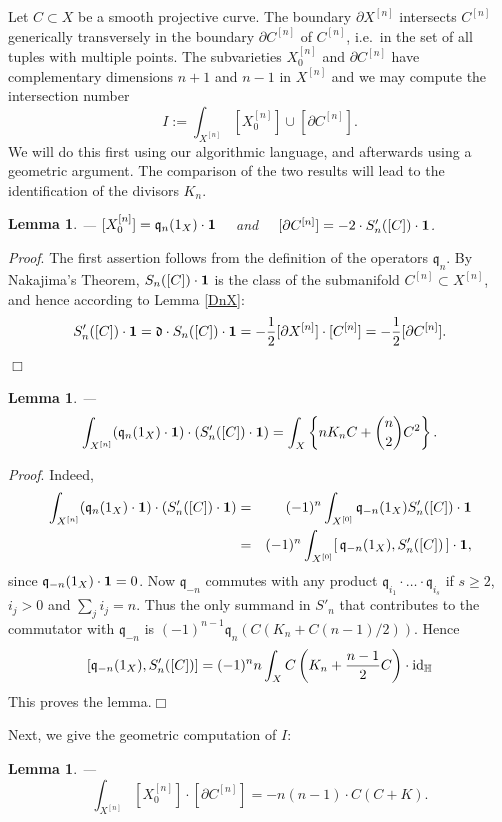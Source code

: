 \documentclass[twoside,11pt]{article}
\newtheorem{lemma}[theorem]{Lemma}
\newcommand{\prf}{{\kursiv Proof}. }
\newcommand{\qed}{\hspace*{\fill}$\Box$\vspace{2ex}}
\newcommand{\kursiv}{\sl}
\newcommand{\IH}{{\mathbb H}}
\newcommand{\gothd}{{\mathfrak d}}
\newcommand{\gothq}{{\mathfrak q}}
\newcommand{\dd}{\gothd}
\newcommand{\qq}{\gothq}
\newcommand{\vacuum}{{\bf 1}}
\newcommand{\id}{{\rm id}}
\begin{document}
Let $C\subset X$ be a smooth projective curve. The boundary $\partial X^{[n]}$
intersects $C^{[n]}$ generically transversely in the boundary 
$\partial C^{[n]}$ of $C^{[n]}$, i.e.\ in the set of all tuples with multiple
points. The subvarieties $X^{[n]}_0$ and $\partial C^{[n]}$ have complementary
dimensions $n+1$ and $n-1$ in $X^{[n]}$ and we may compute the intersection number
$$I:=\int_{X^{[n]}}[X^{[n]}_0]\cup [\partial C^{[n]}].$$
We will do this first using our algorithmic language, and afterwards using a 
geometric argument. The comparison of the two results will lead to the 
identification of the divisors $K_n$.

\begin{lemma}\label{ersterWega}--- $[X^{[n]}_0]=\qq_n(1_X)\cdot\vacuum$ ~~and~~
$[\partial C^{[n]}]=-2\cdot S'_n([C])\cdot\vacuum$.
\end{lemma}


\prf The first assertion follows from the definition of the operators
$\qq_n$.
By Nakajima's Theorem, $S_n([C])\cdot\vacuum$ is the
class of the submanifold $C^{[n]}\subset X^{[n]}$, and hence according to Lemma
\ref{DnX}:
$$S_n'([C])\cdot\vacuum=\dd\cdot S_n([C])\cdot\vacuum=
-\frac{1}{2}[\partial X^{[n]}]\cdot[C^{[n]}]=-\frac{1}{2}[\partial C^{[n]}].$$
\qed

\begin{lemma}\label{ersterWegb}---
$$\int_{X^{[n]}}(\qq_n(1_X)\cdot\vacuum)\cdot(S_n'([C])\cdot\vacuum)=\int_X \left\{nK_nC+\binom{n}{2}C^2\right\}.$$
\end{lemma}

\prf Indeed,
\begin{eqnarray*}
\int_{X^{[n]}}(\qq_n(1_X)\cdot\vacuum)\cdot(S_n'([C])\cdot\vacuum)
&=&(-1)^n\int_{X^{[0]}}\qq_{-n}(1_X)S_n'([C])\cdot\vacuum\\
&=&(-1)^n\int_{X^{[0]}}[\,\qq_{-n}(1_X),S'_n([C])\,]\cdot\vacuum,
\end{eqnarray*}
since $\qq_{-n}(1_X)\cdot\vacuum=0$.
Now $\qq_{-n}$ commutes with any product $\qq_{i_1}\cdot\ldots
\cdot\qq_{i_s}$ if $s\geq2$, $i_j>0$ and $\sum_ji_j=n$. Thus the only summand
in $S'_n$ that contributes to the commutator with $\qq_{-n}$ is $(-1)^{n-1}\qq_n
(C(K_n+C(n-1)/2))$. Hence
$$[\qq_{-n}(1_X), S'_n([C])]
=(-1)^nn\int_XC\left(K_n+\frac{n-1}{2}C\right)\cdot\id_{\IH}$$
This proves the lemma.\qed

Next, we give the geometric computation of $I$:
 
\begin{lemma}\label{zweiterWeg}--- 
$$\int_{X^{[n]}}[X_0^{[n]}]\cdot [\partial C^{[n]}]=-n(n-1)\cdot C(C+K).$$
\end{lemma}
\end{document}
